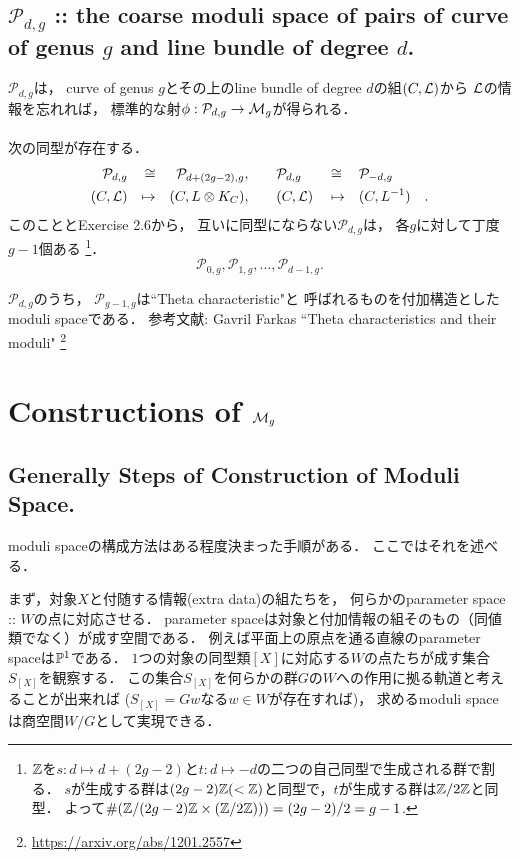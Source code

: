 \documentclass[a4paper]{jsarticle}
\newcommand{\tp}[2]{\texorpdfstring{#1}{#2}}
\newcommand{\modP}{\mathcal{P}}
\begin{document}
    \subsection{\tp{$\modP_{d,g}$}{Pdg}
        :: the coarse moduli space of pairs of curve of genus \tp{$g$}{g} and line bundle of degree \tp{$d$}{d}. }
    $\modP_{d,g}$は，
    curve of genus $g$とその上のline bundle of degree $d$の組$(C, \mathcal{L})$から
    $\mathcal{L}$の情報を忘れれば，
    標準的な射$\phi: \modP_{d,g} \to \modM_g$が得られる．

    \paragraph{}
    次の同型が存在する．
    \[
    \begin{aligned}
        \modP_{d,g}& &\iso& &\modP_{d+(2g-2), g},&
        && \quad
        \modP_{d,g}& &\iso& &\modP_{-d, g}& \\
        (C, \shL)& &\mapsto& &(C, L \otimes K_C),&
        && \quad
        (C, \shL)& &\mapsto& &(C, L^{-1})&.
    \end{aligned}
    \]
    このこととExercise 2.6から，
    互いに同型にならない$\modP_{d,g}$は，
    各$g$に対して丁度$g-1$個ある
    \footnote
    {
        $\mathbb{Z}$を$s: d \mapsto d+(2g-2)$と$t: d \mapsto -d$の二つの自己同型で生成される群で割る．
        $s$が生成する群は$(2g-2)\mathbb{Z} (< \mathbb{Z})$と同型で，$t$が生成する群は$\mathbb{Z}/2\mathbb{Z}$と同型．
        よって$\#( \mathbb{Z}/(2g-2)\mathbb{Z} \times (\mathbb{Z}/2\mathbb{Z})) )=(2g-2)/2=g-1$.
    }．
    \[ \modP_{0,g}, \modP_{1,g}, \dots, \modP_{d-1,g}. \]

    $\modP_{d,g}$のうち，
    $\modP_{g-1, g}$は``Theta characteristic"と
    呼ばれるものを付加構造としたmoduli spaceである．
    参考文献:
    Gavril Farkas
    ``Theta characteristics and their moduli"
    \footnote{\url{https://arxiv.org/abs/1201.2557}}
    
\section{Constructions of \tp{$\mathcal{M}_g$}{Mg}}

    \subsection{Generally Steps of Construction of Moduli Space.}
    moduli spaceの構成方法はある程度決まった手順がある．
    ここではそれを述べる．

    まず，対象$X$と付随する情報(extra data)の組たちを，
    何らかのparameter space :: $W$の点に対応させる．
    parameter spaceは対象と付加情報の組そのもの（同値類でなく）が成す空間である．
    例えば平面上の原点を通る直線のparameter spaceは$\mathbb{P}^1$である．
    $1$つの対象の同型類$[X]$に対応する$W$の点たちが成す集合$S_{[X]}$を観察する．
    この集合$S_{[X]}$を何らかの群$G$の$W$への作用に拠る軌道と考えることが出来れば
    ($S_{[X]}=Gw$なる$w \in W$が存在すれば)，
    求めるmoduli spaceは商空間$W/G$として実現できる．
\end{document}
